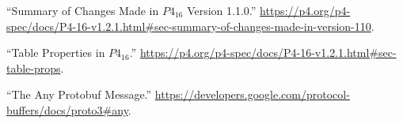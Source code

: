 \documentclass[11pt]{article}
\begin{document}
{{\begin{thebibliography}{39}
\mdbibitemlabel{{}[29]}\textquotedblleft{}Summary of Changes Made in $P4_{16}$ Version 1.1.0.\textquotedblright{} \href{https://p4.org/p4-spec/docs/P4-16-v1.2.1.html\%23sec-summary-of-changes-made-in-version-110}{{\ttfamily https://\hspace{0pt}p4.\hspace{0pt}org/\hspace{0pt}p4-\hspace{0pt}spec/\hspace{0pt}docs/\hspace{0pt}P4-\hspace{0pt}16-\hspace{0pt}v1.\hspace{0pt}2.\hspace{0pt}1.\hspace{0pt}html\#\hspace{0pt}sec-\hspace{0pt}summary-\hspace{0pt}of-\hspace{0pt}changes-\hspace{0pt}made-\hspace{0pt}in-\hspace{0pt}version-\hspace{0pt}110}}.\label{p4revisions110}%

\mdbibitemlabel{{}[30]}\textquotedblleft{}Table Properties in $P4_{16}$.\textquotedblright{} \href{https://p4.org/p4-spec/docs/P4-16-v1.2.1.html\%23sec-table-props}{{\ttfamily https://\hspace{0pt}p4.\hspace{0pt}org/\hspace{0pt}p4-\hspace{0pt}spec/\hspace{0pt}docs/\hspace{0pt}P4-\hspace{0pt}16-\hspace{0pt}v1.\hspace{0pt}2.\hspace{0pt}1.\hspace{0pt}html\#\hspace{0pt}sec-\hspace{0pt}table-\hspace{0pt}props}}.\label{p4tableproperties}%

\mdbibitemlabel{{}[31]}\textquotedblleft{}The Any Protobuf Message.\textquotedblright{} \href{https://developers.google.com/protocol-buffers/docs/proto3\%23any}{{\ttfamily https://\hspace{0pt}developers.\hspace{0pt}google.\hspace{0pt}com/\hspace{0pt}protocol-\hspace{0pt}buffers/\hspace{0pt}docs/\hspace{0pt}proto3\#\hspace{0pt}any}}.\label{protoany}%


\end{thebibliography}}}
\end{document}
